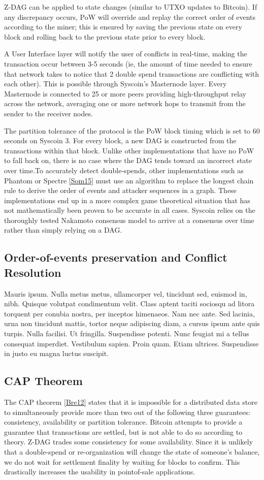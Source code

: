 \documentclass[peerreview]{ieeesyscoin}
\begin{document}
Z-DAG can be applied to state changes (similar to UTXO updates to Bitcoin). If any discrepancy occurs, PoW will override and replay the correct order of events according to the miner; this is ensured by saving
the previous state on every block and rolling back to the previous state prior to every block.

A User Interface layer will notify the user of conflicts in real-time, making the transaction occur between 3-5
seconds (ie, the amount of time needed to ensure that network takes to notice that 2 double spend transactions are conflicting with each other). This is possible through Syscoin’s Masternode layer. Every Masternode is connected to 25 or more peers providing high-throughput relay across the network, averaging one or more network hops to transmit from the sender to the receiver nodes.

The partition tolerance of the protocol is the PoW block timing which is set to 60 seconds on Syscoin 3. For every block, a new DAG is constructed from the transactions within that block. Unlike other implementations that have no PoW to fall back on, there is no case where the DAG tends toward an incorrect state over time.To accurately detect double-spends, other implementations such as Phantom or Spectre \ref{Som15} must use an algorithm to replace the longest chain rule to derive the order of events and attacker sequences in a graph.
These implementations end up in a more complex game theoretical situation that has not mathematically been proven to be accurate in all cases. Syscoin relies on the thoroughly tested Nakamoto consensus model to arrive at a consensus over time rather than simply relying on a DAG.

\subsection{Order-of-events preservation and Conflict Resolution}
Mauris ipsum. Nulla metus metus, ullamcorper vel, tincidunt sed, euismod in, nibh. Quisque volutpat condimentum velit. Class aptent taciti sociosqu ad litora torquent per conubia nostra, per inceptos himenaeos. Nam nec ante. Sed lacinia, urna non tincidunt mattis, tortor neque adipiscing diam, a cursus ipsum ante quis turpis. Nulla facilisi. Ut fringilla. Suspendisse potenti. Nunc feugiat mi a tellus consequat imperdiet. Vestibulum sapien. Proin quam. Etiam ultrices. Suspendisse in justo eu magna luctus suscipit. 


\subsection{CAP Theorem}
The CAP theorem \ref{Bre12} states that it is impossible for a distributed data store to simultaneously provide more than two out of the following three guarantees: consistency, availability or partition tolerance. Bitcoin attempts to provide a guarantee that transactions are settled, but is not able to do so according to theory. Z-DAG trades some consistency for some availability. Since it is unlikely that a double-spend or re-organization will change the state of someone’s balance, we do not wait for settlement finality by waiting for blocks to confirm. This drastically increases the usability in pointof-sale applications.
\end{document}
